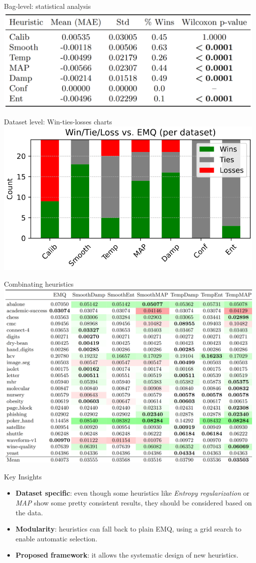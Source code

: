 \documentclass[aspectratio=169]{beamer}
\begin{document}
\begin{frame}{Bag-level: statistical analysis}
  \centering
  \includegraphics[width=0.6\linewidth]{images/statistical_analysis.png}
\end{frame}

\begin{frame}{Dataset level: Win-ties-losses charts}
  \centering
    \includegraphics[width=0.6\linewidth]{images/datasetlevel.png}
\end{frame}

\begin{frame}{Combinating heuristics}
  \centering
    \includegraphics[width=0.6\linewidth]{images/combinations.png}
\end{frame}

\begin{frame}{Key Insights}
  \begin{itemize}
    \item \textbf{Dataset specific}: even though some heuristics like \textit{Entropy regularization} or \textit{MAP} show some pretty consistent results, they should be considered based on the data.
    \item \textbf{Modularity}: heuristics can fall back to plain EMQ, using a grid search to enable automatic selection.
    \item \textbf{Proposed framework}: it allows the systematic design of new heuristics.
  \end{itemize}
\end{frame}
\end{document}
